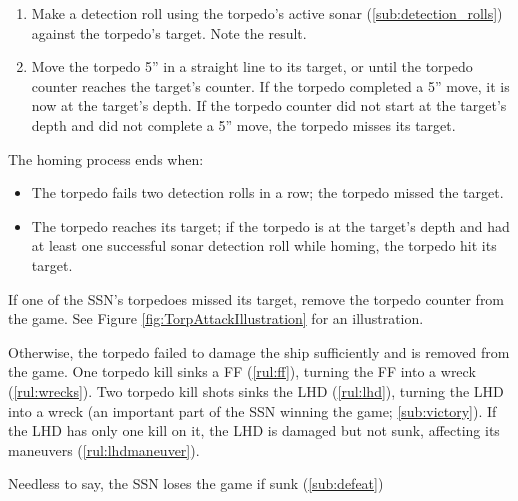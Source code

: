 \documentclass[../TacSubMicroRules.tex]{subfiles}
\begin{document}
 
\begin{enumerate}
    \item Make a detection roll using the torpedo's active sonar (\ref{sub:detection_rolls}) against the torpedo's target.
        Note the result.
    \item Move the torpedo 5'' in a straight line to its target, or until the torpedo counter reaches the target's counter.
        If the torpedo completed a 5'' move, it is now at the target's depth.
        If the torpedo counter did not start at the target's depth and did not complete a 5'' move, the torpedo misses its target.
\end{enumerate}
The homing process ends when:
\begin{itemize}
    \item The torpedo fails two detection rolls in a row; the torpedo missed the target.
    \item The torpedo reaches its target; if the torpedo is at the target's depth and had at least one successful sonar detection roll while homing, the torpedo hit its target.
\end{itemize}
If one of the SSN's torpedoes missed its target, remove the torpedo counter from the game.
See Figure \ref{fig:TorpAttackIllustration} for an illustration.

 
Otherwise, the torpedo failed to damage the ship sufficiently and is removed from the game.
One torpedo kill sinks a FF (\ref{rul:ff}), turning the FF into a wreck (\ref{rul:wrecks}).
Two torpedo kill shots sinks the LHD (\ref{rul:lhd}), turning the LHD into a wreck (an important part of the SSN winning the game; \ref{sub:victory}).
If the LHD has only one kill on it, the LHD is damaged but not sunk, affecting its maneuvers (\ref{rul:lhdmaneuver}).

 
Needless to say, the SSN loses the game if sunk (\ref{sub:defeat})
\end{document}
